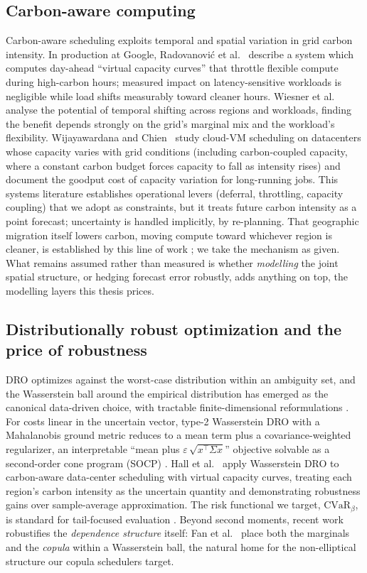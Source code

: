 \documentclass[12pt]{article}
\newcommand{\CVaR}{\mathrm{CVaR}}
\begin{document}
\subsection{Carbon-aware computing}
Carbon-aware scheduling exploits temporal and spatial variation in grid carbon
intensity. In production at Google, Radovanovi\'c et
al.~\citep{radovanovic2022} describe a system which
computes day-ahead ``virtual capacity curves'' that throttle flexible compute during
high-carbon hours; measured impact on latency-sensitive workloads is negligible
while load shifts measurably toward cleaner hours. Wiesner et al.~\citep{wiesner2021} analyse the
potential of temporal shifting across regions and workloads, finding the benefit
depends strongly on the grid's marginal mix and the workload's flexibility.
Wijayawardana and Chien~\citep{wijayawardana2025} study cloud-VM scheduling on datacenters whose capacity
varies with grid conditions (including carbon-coupled capacity, where a constant
carbon budget forces capacity to fall as intensity rises) and document the
goodput cost of capacity variation for long-running jobs. This systems literature
establishes operational levers (deferral, throttling, capacity coupling) that we
adopt as constraints, but it treats future carbon intensity as a point forecast;
uncertainty is handled implicitly, by re-planning. That geographic migration itself
lowers carbon, moving compute toward whichever region is cleaner, is established by
this line of work \citep{radovanovic2022,wiesner2021}; we take the mechanism as given.
What remains assumed rather than measured is whether \emph{modelling} the joint spatial
structure, or hedging forecast error robustly, adds anything on top, the modelling
layers this thesis prices.

\subsection{Distributionally robust optimization and the price of robustness}
DRO optimizes against the worst-case distribution within an ambiguity set, and the
Wasserstein ball around the empirical distribution has emerged as the canonical
data-driven choice, with tractable finite-dimensional reformulations
\citep{esfahani2018,kuhn2019}. For costs linear in the uncertain vector, type-2
Wasserstein DRO with a Mahalanobis ground metric reduces to a mean term plus a
covariance-weighted regularizer, an interpretable ``mean plus
$\varepsilon\,\sqrt{x^\top\Sigma x}$'' objective solvable as a second-order cone
program (SOCP) \citep{blanchet2019}. Hall et al.~\citep{hall2024} apply Wasserstein DRO to
carbon-aware data-center scheduling with virtual capacity curves, treating each
region's carbon intensity as the uncertain quantity and demonstrating robustness
gains over sample-average approximation. The risk functional we target,
$\CVaR_{\beta}$, is standard for tail-focused evaluation \citep{rockafellar2000}.
Beyond second moments, recent work robustifies the \emph{dependence structure}
itself: Fan et al.~\citep{fan2024} place both the marginals and the \emph{copula} within a
Wasserstein ball, the natural home for the non-elliptical structure our copula
schedulers target.
\end{document}
